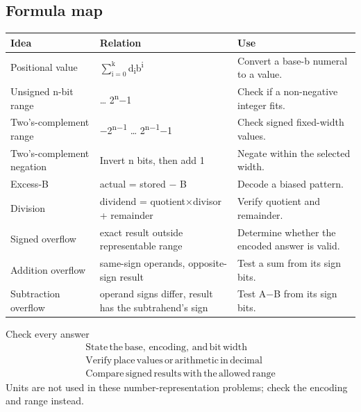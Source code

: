 \documentclass[11pt]{article}
\begin{document}
\begin{keepsection}
\section{Formula map}

\begin{center}\small\begin{tabularx}{\linewidth}{>{\raggedright\arraybackslash}X>{\raggedright\arraybackslash}X>{\raggedright\arraybackslash}X}\toprule
\textbf{Idea} & \textbf{Relation} & \textbf{Use} \\ \midrule
Positional value & $\sum_{\mathrm{i}=0}^{\mathrm{k}} $d\textsubscript{i}b\textsuperscript{i} & Convert a base-b numeral to a value. \\
Unsigned n-bit range & 0 … 2\textsuperscript{n}\ensuremath{-}1 & Check if a non-negative integer fits. \\
Two’s-complement range & \ensuremath{-}2\textsuperscript{n\ensuremath{-}1} … 2\textsuperscript{n\ensuremath{-}1}\ensuremath{-}1 & Check signed fixed-width values. \\
Two’s-complement negation & Invert n bits, then add 1 & Negate within the selected width. \\
Excess-B & actual = stored \ensuremath{-} B & Decode a biased pattern. \\
Division & dividend = quotient\ensuremath{\times}divisor + remainder & Verify quotient and remainder. \\
Signed overflow & exact result outside representable range & Determine whether the encoded answer is valid. \\
Addition overflow & same-sign operands, opposite-sign result & Test a sum from its sign bits. \\
Subtraction overflow & operand signs differ, result has the subtrahend’s sign & Test A\ensuremath{-}B from its sign bits. \\
\bottomrule\end{tabularx}\end{center}

\begin{equationcard}{Check every answer}
\[ \begin{gathered} \text{State}\, \text{the}\, \text{base},\, \text{encoding},\, \text{and}\, \text{bit}\, \text{width} \\ \text{Verify}\, \text{place}\, \text{values}\, \text{or}\, \text{arithmetic}\, \text{in}\, \text{decimal} \\ \text{Compare}\, \text{signed}\, \text{results}\, \text{with}\, \text{the}\, \text{allowed}\, \text{range} \end{gathered} \]
{\small Units are not used in these number-representation problems; check the encoding and range instead.}
\end{equationcard}
\end{keepsection}
\end{document}
